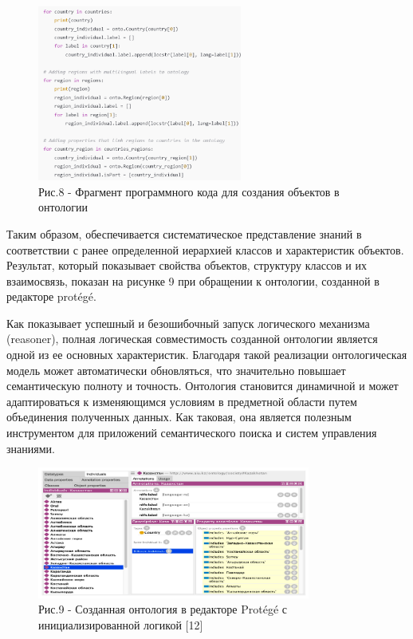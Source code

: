 \begin{figure}[H]
	\centering
	\includegraphics[width=0.6\textwidth]{media/ict2/image156}
	\caption*{Рис.8 - Фрагмент программного кода для создания объектов в онтологии}
\end{figure}

\begin{multicols}{2}
Таким образом, обеспечивается систематическое представление знаний в
соответствии с ранее определенной иерархией классов и характеристик
объектов. Результат, который показывает свойства объектов, структуру
классов и их взаимосвязь, показан на рисунке 9 при обращении к
онтологии, созданной в редакторе protégé.

Как показывает успешный и безошибочный запуск логического механизма
(reasoner), полная логическая совместимость созданной онтологии является
одной из ее основных характеристик. Благодаря такой реализации
онтологическая модель может автоматически обновляться, что значительно
повышает семантическую полноту и точность. Онтология становится
динамичной и может адаптироваться к изменяющимся условиям в предметной
области путем объединения полученных данных. Как таковая, она является
полезным инструментом для приложений семантического поиска и систем
управления знаниями.
\end{multicols}


\begin{figure}[H]
	\centering
	\includegraphics[width=0.8\textwidth]{media/ict2/image157}
	\caption*{Рис.9 - Созданная онтология в редакторе Protégé с инициализированной логикой {[}12{]}}
\end{figure}

